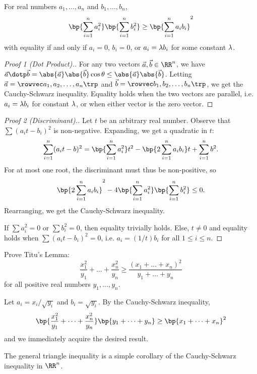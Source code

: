 \begin{proposition}
    For real numbers $a_1, \dots, a_n$ and $b_1, \dots, b_n$, \[\bp{\sum_{i = 1}^n a_i^2} \bp{\sum_{i = 1}^n b_i^2} \geq \bp{\sum_{i =1}^n a_i b_i}^2\] with equality if and only if $a_i = 0$, $b_i = 0$, or $a_i = \lambda b_i$ for some constant $\lambda$.
\end{proposition}
\begin{proof}[Proof 1 (Dot Product).]
    For any two vectors $\vec a, \vec b \in \RR^n$, we have $\vec a \dotp \vec b = \abs{\vec a} \abs{\vec b} \cos \t \leq \abs{\vec a} \abs{\vec b}$. Letting $\vec a = \cvecivx{a_1}{a_2}{\dots}{a_n}$ and $\vec b = \cvecivx{b_1}{b_2}{\dots}{b_n}$, we get the Cauchy-Schwarz inequality. Equality holds when the two vectors are parallel, i.e. $a_i = \lambda b_i$ for constant $\lambda$, or when either vector is the zero vector.
\end{proof}
\begin{proof}[Proof 2 (Discriminant).]
    Let $t$ be an arbitrary real number. Observe that $\sum (a_i t - b_i)^2$ is non-negative. Expanding, we get a quadratic in $t$: \[\sum_{i = 1}^n (a_i t - b)^2 = \bp{\sum_{i = 1}^n a_i^2} t^2 - \bp{2\sum_{i = 1}^n a_i b_i} t + \sum_{i = 1}^n b^2.\] For at most one root, the discriminant must thus be non-positive, so \[\bp{2\sum_{i = 1}^n a_i b_i}^2 - 4\bp{\sum_{i = 1}^n a_i^2}\bp{\sum_{i = 1}^n b_i^2} \leq 0.\] Rearranging, we get the Cauchy-Schwarz inequality.
    
    If $\sum a_i^2 = 0$ or $\sum b_i^2 = 0$, then equality trivially holds. Else, $t \neq 0$ and equality holds when $\sum (a_i t - b_i)^2 = 0$, i.e. $a_i = (1/t) b_i$ for all $1 \leq i \leq n$.
\end{proof}

\begin{sample}
    Prove Titu's Lemma: \[\frac{x_1^2}{y_1} + \dots + \frac{x_n^2}{y_n} \geq \frac{(x_1 + \dots + x_n)^2}{y_1 + \dots + y_n}\] for all positive real numbers $y_1, \dots, y_n$.
\end{sample}
\begin{sampans}
    Let $a_i = x_i/\sqrt{y_i}$ and $b_i = \sqrt{y_i}$. By the Cauchy-Schwarz inequality, \[\bp{\frac{x_1^2}{y_1} + \dots + \frac{x_n^2}{y_n}}\bp{y_1 + \dots + y_n} \geq \bp{x_1 + \dots + x_n}^2\] and we immediately acquire the desired result.
\end{sampans}

The general triangle inequality is a simple corollary of the Cauchy-Schwarz inequality in $\RR^n$.

